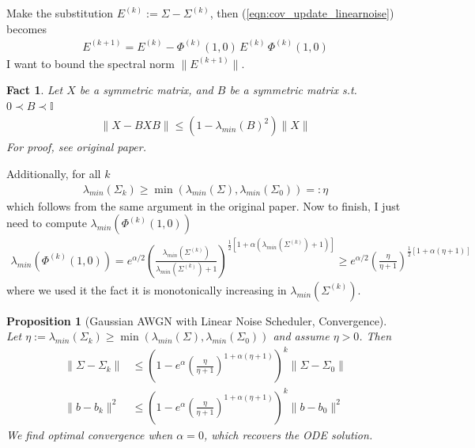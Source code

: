 \documentclass[12pt,fleqn]{article}
\numberwithin{equation}{section}
\newtheorem{proposition}{Proposition}
\newtheorem{fact}{Fact}
\begin{document}
Make the substitution $E^{(k)} := \Sigma - \Sigma^{(k)}$, then (\ref{eqn:cov_update_linearnoise}) becomes
\begin{align}
	E^{(k+1)} = E^{(k)} - \Phi^{(k)}(1,0) \, E^{(k)} \, \Phi^{(k)}(1,0)
\end{align}
I want to bound the spectral norm $\|E^{(k+1)} \|$.
\begin{fact}
Let $X$ be a symmetric matrix, and $B$ be a symmetric matrix s.t. $0 \prec B \prec \mathbb I$
	\begin{align}
	\| X - B X B\| \leq (1 - \lambda_{min}(B)^2) \|X\|
\end{align}
For proof, see original paper.
\end{fact}
Additionally, for all $k$
\begin{align}
	\lambda_{min}(\Sigma_k) \geq \min(\lambda_{min}(\Sigma), \lambda_{min}(\Sigma_0) ) =: \eta
\end{align}
which follows from the same argument in the original paper. Now to finish, I just need to compute $\lambda_{min}(\Phi^{(k)}(1,0))$
\begin{align}
	\lambda_{min}(\Phi^{(k)}(1,0)) = e^{\alpha/2} \left( \frac{\lambda_{min}(\Sigma^{(k)})}{\lambda_{min}(\Sigma^{(k)}) + 1}\right)^{\frac{1}{2}[1 + \alpha(\lambda_{min}(\Sigma^{(k)}) + 1)]} \geq e^{\alpha/2} \left( \frac{\eta}{\eta + 1} \right)^{\frac{1}{2}[1 + \alpha(\eta + 1)]}
\end{align}
where we used it the fact it is monotonically increasing in $\lambda_{min}(\Sigma^{(k)})$.

\begin{proposition}[Gaussian AWGN with Linear Noise Scheduler, Convergence]
	Let $\eta := \lambda_{min}(\Sigma_k) \geq \min(\lambda_{min}(\Sigma), \lambda_{min}(\Sigma_0) )$ and assume $\eta > 0$. Then
	\begin{align}
		\| \Sigma - \Sigma_k\| & \leq \left( 1 - e^{\alpha} \left( \frac{\eta}{\eta + 1} \right)^{1 + \alpha(\eta + 1)}\right)^k \| \Sigma - \Sigma_0\| \\
		\| b - b_k\|^2 & \leq \left( 1 - e^{\alpha} \left( \frac{\eta}{\eta + 1} \right)^{1 + \alpha(\eta + 1)}\right)^k \| b - b_0\|^2
	\end{align}
    We find optimal convergence when $\alpha = 0$, which recovers the ODE solution.
\end{proposition}
\end{document}
